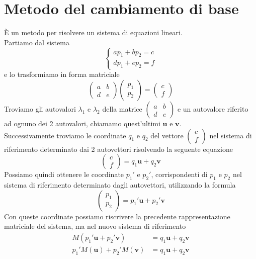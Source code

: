 \documentclass[10pt,a4paper]{article}
\theoremstyle{plain}
\theoremstyle{definition}
\begin{document}
\section{Metodo del cambiamento di base}
 È un metodo per risolvere un sistema di equazioni lineari. \\
Partiamo dal sistema
\[
\begin{cases*}
ap_1 + bp_2 = c \\
dp_1 + ep_2 = f
\end{cases*}
\]
e lo trasformiamo in forma matriciale
\[
\begin{pmatrix}
a & b \\
d & e
\end{pmatrix}
\begin{pmatrix}
p_1 \\
p_2
\end{pmatrix}
= \begin{pmatrix}
c \\
f
\end{pmatrix}
\]
Troviamo gli autovalori $\lambda_1$ e $\lambda_2$ della matrice $\begin{pmatrix}
a & b \\
d & e
\end{pmatrix}$ e un autovalore riferito ad ognuno dei 2 autovalori, chiamamo quest'ultimi $\mathbf{u}$ e $\mathbf{v}$. \\
Successivamente troviamo le coordinate $q_1$ e $q_2$ del vettore $\begin{pmatrix}
c \\
f
\end{pmatrix}$ nel sistema di riferimento determinato dai 2 autovettori risolvendo la seguente equazione
\[
\begin{pmatrix}
c \\
f
\end{pmatrix}=q_1\mathbf{u} + q_2\mathbf{v}
\]
Possiamo quindi ottenere le coordinate $p_1'$ e $p_2'$, corrispondenti di $p_1$ e $p_2$ nel sistema di riferimento determinato dagli autovettori, utilizzando la formula 
\[
\begin{pmatrix}
p_1 \\
p_2
\end{pmatrix}=p_1'\mathbf{u}+p_2'\mathbf{v}
\]
Con queste coordinate possiamo riscrivere la precedente rappresentazione matriciale del sistema, ma nel nuovo sistema di riferimento
\begin{align*}
M(p_1'\mathbf{u}+p_2'\mathbf{v})&=q_1\mathbf{u}+q_2\mathbf{v}\\
p_1'M(\mathbf{u})+p_2'M(\mathbf{v})&=q_1\mathbf{u}+q_2\mathbf{v}
\end{align*}
\end{document}
